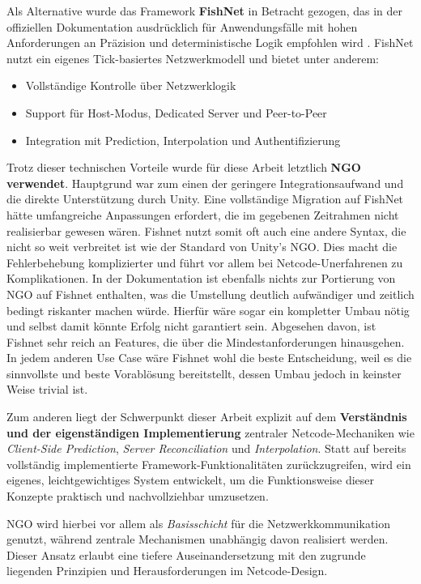 Als Alternative wurde das Framework \textbf{FishNet} in Betracht gezogen, das in der offiziellen Dokumentation ausdrücklich für Anwendungsfälle mit hohen Anforderungen an Präzision und deterministische Logik empfohlen wird \cite{fishnetdocs}. FishNet nutzt ein eigenes Tick-basiertes Netzwerkmodell und bietet unter anderem:

\begin{itemize}
    \item Vollständige Kontrolle über Netzwerklogik
    \item Support für Host-Modus, Dedicated Server und Peer-to-Peer
    \item Integration mit Prediction, Interpolation und Authentifizierung
\end{itemize}

Trotz dieser technischen Vorteile wurde für diese Arbeit letztlich \textbf{NGO verwendet}. Hauptgrund war zum einen der geringere Integrationsaufwand und die direkte Unterstützung durch Unity. Eine vollständige Migration auf FishNet hätte umfangreiche Anpassungen erfordert, die im gegebenen Zeitrahmen nicht realisierbar gewesen wären.
Fishnet nutzt somit oft auch eine andere Syntax, die nicht so weit verbreitet ist wie der Standard von Unity's NGO. Dies macht die Fehlerbehebung komplizierter und führt vor allem bei Netcode-Unerfahrenen zu Komplikationen.  
In der Dokumentation ist ebenfalls nichts zur Portierung von NGO auf Fishnet enthalten, was die Umstellung deutlich aufwändiger und zeitlich bedingt riskanter machen würde. Hierfür wäre sogar ein kompletter Umbau nötig und selbst damit könnte Erfolg nicht garantiert sein. 
Abgesehen davon, ist Fishnet sehr reich an Features, die über die Mindestanforderungen hinausgehen. In jedem anderen Use Case wäre Fishnet wohl die beste Entscheidung, weil es die sinnvollste und beste Vorablösung bereitstellt, dessen Umbau jedoch in keinster Weise trivial ist.

Zum anderen liegt der Schwerpunkt dieser Arbeit explizit auf dem \textbf{Verständnis und der eigenständigen Implementierung} zentraler Netcode-Mechaniken wie \textit{Client-Side Prediction}, \textit{Server Reconciliation} und \textit{Interpolation}. Statt auf bereits vollständig implementierte Framework-Funktionalitäten zurückzugreifen, wird ein eigenes, leichtgewichtiges System entwickelt, um die Funktionsweise dieser Konzepte praktisch und nachvollziehbar umzusetzen.

NGO wird hierbei vor allem als \textit{Basisschicht} für die Netzwerkkommunikation genutzt, während zentrale Mechanismen unabhängig davon realisiert werden. Dieser Ansatz erlaubt eine tiefere Auseinandersetzung mit den zugrunde liegenden Prinzipien und Herausforderungen im Netcode-Design.
